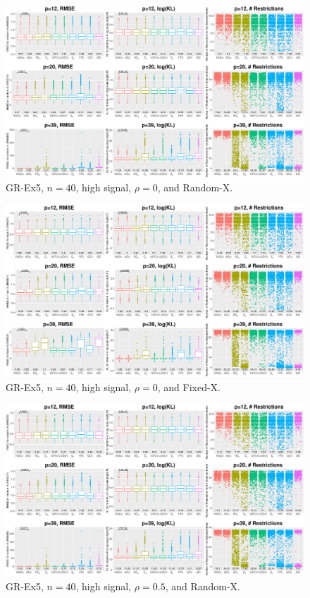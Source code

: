 \clearpage
\begin{figure}[!ht]
\centering
\includegraphics[width=\textwidth]{figures/supplement/randomx_GR-Ex5_n40_hsnr_rho0.eps}
\caption{GR-Ex5, $n=40$, high signal, $\rho=0$, and Random-X.}
\end{figure}
\begin{figure}[!ht]
\centering
\includegraphics[width=\textwidth]{figures/supplement/fixedx_GR-Ex5_n40_hsnr_rho0.eps}
\caption{GR-Ex5, $n=40$, high signal, $\rho=0$, and Fixed-X.}
\end{figure}
\clearpage
\begin{figure}[!ht]
\centering
\includegraphics[width=\textwidth]{figures/supplement/randomx_GR-Ex5_n40_hsnr_rho05.eps}
\caption{GR-Ex5, $n=40$, high signal, $\rho=0.5$, and Random-X.}
\end{figure}
